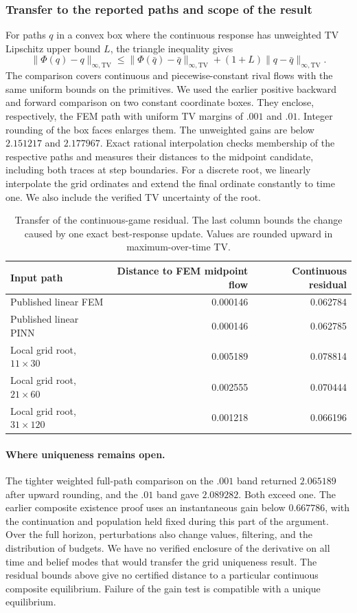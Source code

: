 \subsubsection{Transfer to the reported paths and scope of the result}
For paths $q$ in a convex box where the continuous response has
unweighted TV Lipschitz upper bound $L$, the triangle inequality gives
\[
 \|\Phi(q)-q\|_{\infty,\mathrm{TV}}\leq
 \|\Phi(\bar q)-\bar q\|_{\infty,\mathrm{TV}}+
 (1+L)\|q-\bar q\|_{\infty,\mathrm{TV}} .
\]
The comparison covers continuous and piecewise-constant rival flows with
the same uniform bounds on the primitives. We used the earlier positive
backward and forward comparison on two constant coordinate boxes.
They enclose, respectively, the FEM path with uniform TV margins of
$.001$ and $.01$. Integer rounding of the box faces enlarges them.
The unweighted gains are below $2.151217$ and $2.177967$.
Exact rational interpolation checks membership of the respective paths
and measures their distances to the midpoint candidate, including both
traces at step boundaries. For a discrete root, we linearly interpolate
the grid ordinates and extend the final ordinate constantly to time one.
We also include the verified TV uncertainty of the root.

\begin{table}[htbp]\centering\small
\caption{Transfer of the continuous-game residual. The last column bounds
the change caused by one exact best-response update. Values are rounded
upward in maximum-over-time TV.}\label{tab:cg-transfer}
\begin{tabular}{@{}lrr@{}}\toprule
Input path & Distance to FEM midpoint flow & Continuous residual\\\midrule
Published linear FEM           & 0.000146 & 0.062784\\
Published linear PINN          & 0.000146 & 0.062785\\
Local grid root, $11\times30$  & 0.005189 & 0.078814\\
Local grid root, $21\times60$  & 0.002555 & 0.070444\\
Local grid root, $31\times120$ & 0.001218 & 0.066196\\\bottomrule
\end{tabular}
\end{table}

\paragraph{Where uniqueness remains open.}
The tighter weighted full-path comparison on the $.001$ band returned
$2.065189$ after upward rounding, and the $.01$ band gave $2.089282$.
Both exceed one. The earlier composite existence proof uses an
instantaneous gain below $0.667786$, with the continuation and population
held fixed during this part of the argument. Over the full horizon,
perturbations also change values, filtering, and the distribution of
budgets. We have no verified enclosure of the derivative on all time
and belief modes that would transfer the grid uniqueness result.
The residual bounds above give no certified distance to a particular
continuous composite equilibrium. Failure of the gain test is compatible
with a unique equilibrium.

